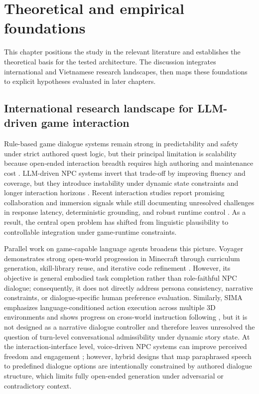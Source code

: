 ﻿\documentclass[a4paper,12pt]{article}
\begin{document}
\section{Theoretical and empirical foundations}
This chapter positions the study in the relevant literature and establishes the theoretical basis for the tested architecture. The discussion integrates international and Vietnamese research landscapes, then maps these foundations to explicit hypotheses evaluated in later chapters.
\subsection{International research landscape for LLM-driven game interaction}
Rule-based game dialogue systems remain strong in predictability and safety under strict authored quest logic, but their principal limitation is scalability because open-ended interaction breadth requires high authoring and maintenance cost \cite{Gallotta2024Survey,Sweetser2024Scoping}. LLM-driven NPC systems invert that trade-off by improving fluency and coverage, but they introduce instability under dynamic state constraints and longer interaction horizons \cite{Park2023GenerativeAgents,Gallotta2024Survey,Sweetser2024Scoping}. Recent interaction studies report promising collaboration and immersion signals while still documenting unresolved challenges in response latency, deterministic grounding, and robust runtime control \cite{Rao2024Minecraft,Christiansen2024Presence}. As a result, the central open problem has shifted from linguistic plausibility to controllable integration under game-runtime constraints.

Parallel work on game-capable language agents broadens this picture. Voyager demonstrates strong open-world progression in Minecraft through curriculum generation, skill-library reuse, and iterative code refinement \cite{Wang2023Voyager}. However, its objective is general embodied task completion rather than role-faithful NPC dialogue; consequently, it does not directly address persona consistency, narrative constraints, or dialogue-specific human preference evaluation. Similarly, SIMA emphasizes language-conditioned action execution across multiple 3D environments and shows progress on cross-world instruction following \cite{DeepMind2024SIMA}, but it is not designed as a narrative dialogue controller and therefore leaves unresolved the question of turn-level conversational admissibility under dynamic story state. At the interaction-interface level, voice-driven NPC systems can improve perceived freedom and engagement \cite{Wevelsiep2025Voice}; however, hybrid designs that map paraphrased speech to predefined dialogue options are intentionally constrained by authored dialogue structure, which limits fully open-ended generation under adversarial or contradictory context.
\end{document}
